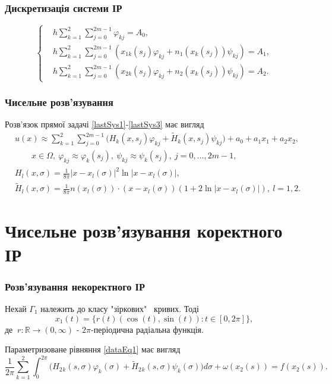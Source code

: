 \documentclass[10pt]{beamer}
\begin{document}
\begin{frame}
\frametitle{Дискретизація системи ІР}
\begin{equation} \label{lastSys3}
  \left\{
  \begin{split}
	 &h\sum_{k=1}^{2}\sum_{j=0}^{2m-1}\varphi_{kj}=A_0, \\
	 &h\sum_{k=1}^{2}\sum_{j=0}^{2m-1}(x_{1k}(s_j)\varphi_{kj}+n_1(x_k(s_j))\psi_{kj})=A_1, \\
	 &h\sum_{k=1}^{2}\sum_{j=0}^{2m-1}(x_{2k}(s_j)\varphi_{kj}+n_2(x_k(s_j))\psi_{kj})=A_2.
\end{split}
\right.
\end{equation}
\end{frame}

\begin{frame}
\frametitle{Чисельне розв'язування}

Розв'язок прямої задачі \eqref{lastSys1}-\eqref{lastSys3} має вигляд
 \begin{equation*} \label{solutionEq}
 \begin{split}
 	&u(x) \approx\sum_{k=1}^{2}\sum_{j=0}^{2m-1}\bigg(H_k(x,s_j)\varphi_{kj}+\tilde{H}_k(x,s_j)\psi_{kj}\bigg) +a_0+a_1x_1+a_2x_2,\\
 	&\quad\quad x\in\Omega, \ \varphi_{kj}\approx\varphi_k(s_j), \ \psi_{kj}\approx\psi_k(s_j), \ j=0,...,2m-1, \\
	&H_{l}(x, \sigma) = \frac{1}{8\pi}|x-x_l(\sigma)|^2\ln|x-x_l(\sigma)|,\\
	&\tilde{H}_{l}(x, \sigma) = \frac{1}{8\pi}n(x_l(\sigma))\cdot(x-x_l(\sigma))(1+2\ln|x-x_l(\sigma)|), \ l=1, 2.
\end{split}
 \end{equation*}
 
\end{frame}
 
 \section{Чисельне розв'язування коректного ІР}
 \begin{frame}
\frametitle{Розв'язування некоректного ІР}

Нехай $\Gamma_1$ належить до класу "зіркових" \ кривих. Тоді 
$$x_1(t)=\{r(t)(\cos (t), \sin (t)) : t\in[0,2\pi] \},$$
де $\ r : \mathbb{R} \to (0, \infty)$ - $2\pi$-періодична радіальна функція.
 
 Параметризоване рівняння \eqref{dataEq1} має вигляд
 \begin{equation}
 \label{paramDataEq}
	 \frac{1}{2\pi}\sum_{k=1}^{2}\int_{0}^{2\pi}\bigg(H_2{_k}(s, \sigma)\varphi_k(\sigma)+\tilde{H}_2{_k}(s, \sigma)\psi_k(\sigma)\bigg)d\sigma+\omega(x_2(s))=f(x_2(s)).
\end{equation}

\end{frame}
\end{document}
